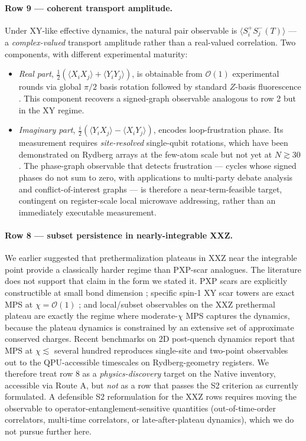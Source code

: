 \documentclass[10pt]{article}
\begin{document}
\paragraph{Row 9 --- coherent transport amplitude.}
Under XY-like effective dynamics, the natural pair observable is $\langle S^+_i S^-_j(T)\rangle$ --- a \emph{complex-valued} transport amplitude rather than a real-valued correlation. Two components, with different experimental maturity:
\begin{itemize}[leftmargin=2em, itemsep=0.2em, topsep=0.3em]
\item[(i)] \emph{Real part}, $\tfrac{1}{2}(\langle X_i X_j\rangle + \langle Y_i Y_j\rangle)$, is obtainable from $\mathcal{O}(1)$ experimental rounds via global $\pi/2$ basis rotation followed by standard $Z$-basis fluorescence \cite{chen2024spectroscopy}. This component recovers a signed-graph observable analogous to row 2 but in the XY regime.
\item[(ii)] \emph{Imaginary part}, $\tfrac{i}{2}(\langle Y_i X_j\rangle - \langle X_i Y_j\rangle)$, encodes loop-frustration phase. Its measurement requires \emph{site-resolved} single-qubit rotations, which have been demonstrated on Rydberg arrays at the few-atom scale \cite{bornet2024arbitrary} but not yet at $N \gtrsim 30$. The phase-graph observable that detects frustration --- cycles whose signed phases do not sum to zero, with applications to multi-party debate analysis and conflict-of-interest graphs --- is therefore a near-term-feasible target, contingent on register-scale local microwave addressing, rather than an immediately executable measurement.
\end{itemize}

\paragraph{Row 8 --- subset persistence in nearly-integrable XXZ.}
We earlier suggested that prethermalization plateaus in XXZ near the integrable point provide a classically harder regime than PXP-scar analogues. The literature does not support that claim in the form we stated it. PXP scars are explicitly constructible at small bond dimension \cite{lin2019pxp}; specific spin-1 XY scar towers are exact MPS at $\chi = \mathcal{O}(1)$ \cite{schecter2019weak}; and local/subset observables on the XXZ prethermal plateau are exactly the regime where moderate-$\chi$ MPS captures the dynamics, because the plateau dynamics is constrained by an extensive set of approximate conserved charges. Recent benchmarks on 2D post-quench dynamics \cite{vovrosh2025quench2d,vovrosh2025crossover} report that MPS at $\chi \lesssim$ several hundred reproduces single-site and two-point observables out to the QPU-accessible timescales on Rydberg-geometry registers. We therefore treat row 8 as a \emph{physics-discovery} target on the Native inventory, accessible via Route A, but \emph{not} as a row that passes the S2 criterion as currently formulated. A defensible S2 reformulation for the XXZ rows requires moving the observable to operator-entanglement-sensitive quantities (out-of-time-order correlators, multi-time correlators, or late-after-plateau dynamics), which we do not pursue further here.
\end{document}
